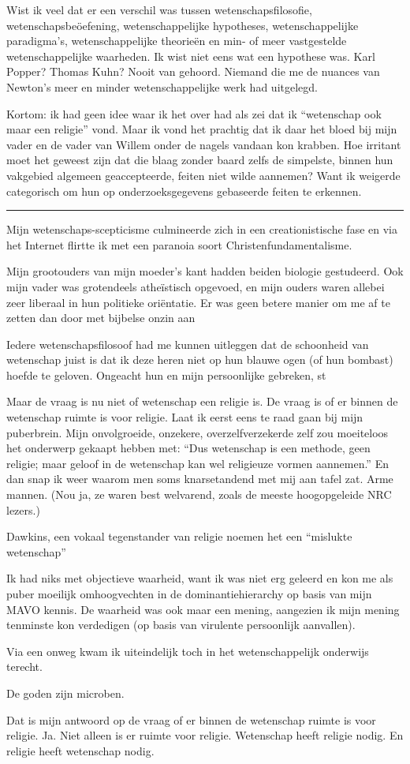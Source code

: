 \documentclass[12pt,a4paper]{article}
\begin{document}
Wist ik veel dat er een verschil was tussen wetenschapsfilosofie, weten\-schaps\-beöef\-ening, wetenschappelijke hypotheses, wetenschappelijke paradigma's, wetenschappelijke theorieën en min- of meer vastgestelde wetenschappelijke waarheden. Ik wist niet eens wat een hypothese was. Karl Popper? Thomas Kuhn? Nooit van gehoord. Niemand die me de nuances van Newton's meer en minder wetenschappelijke werk had uitgelegd.

Kortom: ik had geen idee waar ik het over had als zei dat ik “wetenschap ook maar een religie” vond. Maar ik vond het prachtig dat ik daar het bloed bij mijn vader en de vader van Willem onder de nagels vandaan kon krabben. Hoe irritant moet het geweest zijn dat die blaag zonder baard zelfs de simpelste, binnen hun vakgebied algemeen geaccepteerde, feiten niet wilde aannemen? Want ik weigerde categorisch om hun op onderzoeksgegevens gebaseerde feiten te erkennen.

\par\noindent\rule{\textwidth}{0.4pt}


Mijn wetenschaps-scepticisme culmineerde zich in een creationistische fase en via het Internet flirtte ik met een paranoia soort Christenfundamentalisme.

Mijn grootouders van mijn moeder's kant hadden beiden biologie gestudeerd. Ook mijn vader was grotendeels atheïstisch opgevoed, en mijn ouders waren allebei zeer liberaal in hun politieke oriëntatie. Er was geen betere manier om me af te zetten dan door met bijbelse onzin aan 



Iedere wetenschapsfilosoof had me kunnen uitleggen dat de schoonheid van wetenschap juist is dat ik deze heren niet op hun blauwe ogen (of hun bombast) hoefde te geloven. Ongeacht hun en mijn persoonlijke gebreken, st

Maar de vraag is nu niet of wetenschap een religie is. De vraag is of er binnen de wetenschap ruimte is voor religie. Laat ik eerst eens te raad gaan bij mijn puberbrein. Mijn onvolgroeide, onzekere, overzelfverzekerde zelf zou moeiteloos het onderwerp gekaapt hebben met: “Dus wetenschap is een methode, geen religie; maar geloof in de wetenschap kan wel religieuze vormen aannemen.” En dan snap ik weer waarom men soms knarsetandend met mij aan tafel zat. Arme mannen. (Nou ja, ze waren best welvarend, zoals de meeste hoogopgeleide NRC lezers.)

Dawkins, een vokaal tegenstander van religie noemen het een “mislukte wetenschap”

Ik had niks met objectieve waarheid, want ik was niet erg geleerd en kon me als puber moeilijk omhoogvechten in de dominantiehierarchy op basis van mijn MAVO kennis. De waarheid was ook maar een mening, aangezien ik mijn mening tenminste kon verdedigen (op basis van virulente persoonlijk aanvallen).


Via een onweg kwam ik uiteindelijk toch in het wetenschappelijk onderwijs terecht.

De goden zijn microben.

Dat is mijn antwoord op de vraag of er binnen de wetenschap ruimte is voor religie. Ja. Niet alleen is er ruimte voor religie. Wetenschap heeft religie nodig. En religie heeft wetenschap nodig.
\end{document}
